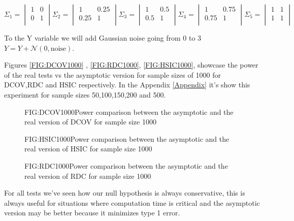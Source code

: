 $$\Sigma_{1} =\begin{vmatrix}1&0\\0&1\\ \end{vmatrix} \Sigma_{2} =\begin{vmatrix}1&0.25\\0.25&1\\ \end{vmatrix} \Sigma_{3} =\begin{vmatrix}1&0.5\\0.5&1\\ \end{vmatrix} \Sigma_{4} =\begin{vmatrix}1&0.75\\0.75&1\\ \end{vmatrix} \Sigma_{5} =\begin{vmatrix}1&1\\1&1\\ \end{vmatrix} $$

To the Y variable we will add  Gaussian noise going from 0 to 3
$ Y = Y + \mathcal{N}(0,\text{noise}) $.

Figures \ref{FIG:DCOV1000} , \ref{FIG:RDC1000}, \ref{FIG:HSIC1000}, showcase the power of the real tests vs the asymptotic version for sample sizes of 1000  for DCOV,RDC and HSIC respectively. In the Appendix \ref{Appendix} it's show this experiment for sample sizes 50,100,150,200 and 500.
\FloatBarrier
\begin{figure}[DCOV asymptotic size 1000]{FIG:DCOV1000}{Power comparison between the asymptotic and the real version of DCOV for sample size 1000}
\end{figure}
\begin{figure}[HSIC asymptotic size 1000]{FIG:HSIC1000}{Power comparison between the asymptotic and the real version of HSIC for sample size 1000}
\end{figure}
\begin{figure}[RDC asymptotic size 1000]{FIG:RDC1000}{Power comparison between the asymptotic and the real version of RDC for sample size 1000}
\end{figure}
\FloatBarrier
For all tests we've seen how our null hypothesis is always conservative, this is always useful for situations where computation time is critical and the asymptotic version may be better because it minimizes type 1 error.

